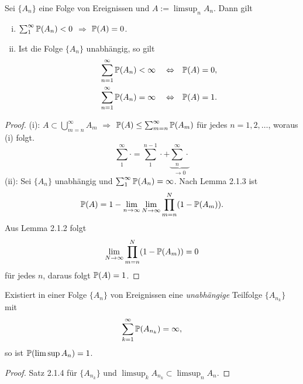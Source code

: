 \begin{thm}
  Sei $\{A_n\}$ eine Folge von Ereignissen und $A := \limsup_n A_n$. Dann gilt
  \begin{enumerate}[(i)]
  \item $\sum_1^\infty \mathbb{P}(A_n) < 0$ $\Rightarrow$ $\mathbb{P}(A) = 0$.
  \item Ist die Folge $\{A_n\}$ unabhängig, so gilt
    \[ \begin{aligned}
        \sum_{n=1}^\infty \mathbb{P}(A_n) &< \infty & &\Leftrightarrow & \mathbb{P}(A) &= 0, \\
        \sum_{n=1}^\infty \mathbb{P}(A_n) &= \infty & &\Leftrightarrow & \mathbb{P}(A) &= 1.
      \end{aligned} \]
  \end{enumerate}
\end{thm}

\begin{proof}
  (i): $A \subset \bigcup_{m=n}^\infty A_m$ $\Rightarrow$ $\mathbb{P}(A) \le
  \sum_{m=n}^\infty \mathbb{P}(A_m)$ für jedes $n=1,2,\ldots$, woraus (i) folgt.
  \[ \sum_1^\infty \cdot = \sum_1^{n-1} \cdot + \underbrace{\sum_n^\infty
      \cdot}_{\to 0} \]
  (ii): Sei $\{ A_n \}$ unabhängig und $\sum_1^\infty \mathbb{P}(A_n) = \infty$. Nach
  Lemma 2.1.3 ist
  \[ \mathbb{P}(A) = 1 - \lim_{n \to \infty} \lim_{N \to \infty} \prod_{m=n}^N (1 -
    \mathbb{P}(A_m) ). \]
  Aus Lemma 2.1.2 folgt
  \[ \lim_{N \to \infty} \prod_{m=n}^N (1 - \mathbb{P}(A_m)) = 0 \]
  für jedes $n$, daraus folgt $\mathbb{P}(A) = 1$.
\end{proof}

\begin{folg}
  Existiert in einer Folge $\{ A_n \}$ von Ereignissen eine \emph{unabhängige}
  Teilfolge $\{A_{n_k}\}$ mit
  \[ \sum_{k=1}^\infty \mathbb{P}(A_{n_k}) = \infty, \]
  so ist $\mathbb{P}( \limsup A_n ) = 1$.
\end{folg}

\begin{proof}
  Satz 2.1.4 für $\{A_{n_k}\}$ und $\limsup_k A_{n_k} \subset \limsup_n A_n $.
\end{proof}

